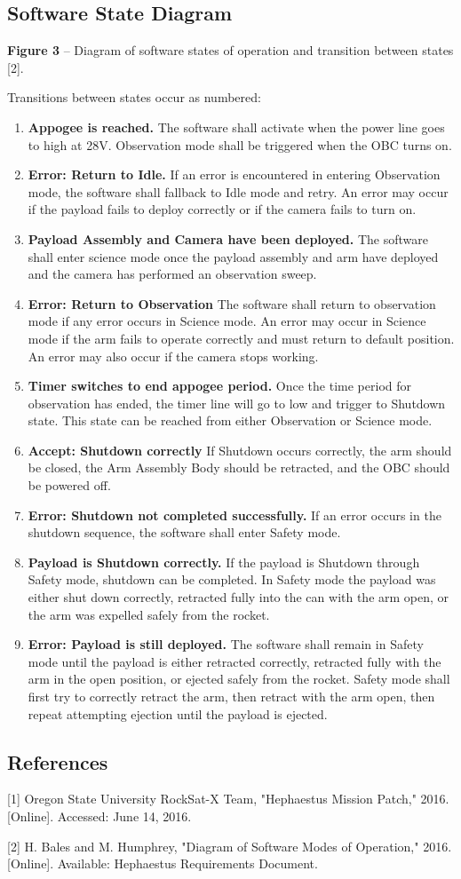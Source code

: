 \subsection{Software State Diagram}

\begin{center}
\textbf{Figure 3} -- Diagram of software states of operation and transition between states [2].

Transitions between states occur as numbered:

\begin{enumerate}
\item{\textbf{Appogee is reached.} The software shall activate when the power line goes to high at 28V. Observation mode shall be triggered when the OBC turns on.}
\item{\textbf{Error: Return to Idle.} If an error is encountered in entering Observation mode, the software shall fallback to Idle mode and retry. An error may occur if the payload fails to deploy correctly or if the camera fails to turn on.}
\item{\textbf{Payload Assembly and Camera have been deployed.} The software shall enter science mode once the payload assembly and arm have deployed and the camera has performed an observation sweep.}
\item{\textbf{Error: Return to Observation} The software shall return to observation mode if any error occurs in Science mode. An error may occur in Science mode if the arm fails to operate correctly and must return to default position. An error may also occur if the camera stops working.}
\item{\textbf{Timer switches to end appogee period.} Once the time period for observation has ended, the timer line will go to low and trigger to Shutdown state. This state can be reached from either Observation or Science mode.}
\item{\textbf{Accept: Shutdown correctly} If Shutdown occurs correctly, the arm should be closed, the Arm Assembly Body should be retracted, and the OBC should be powered off.}
\item{\textbf{Error: Shutdown not completed successfully.} If an error occurs in the shutdown sequence, the software shall enter Safety mode.}
\item{\textbf{Payload is Shutdown correctly.} If the payload is Shutdown through Safety mode, shutdown can be completed. In Safety mode the payload was either shut down correctly, retracted fully into the can with the arm open, or the arm was expelled safely from the rocket.}
\item{\textbf{Error: Payload is still deployed.} The software shall remain in Safety mode until the payload is either retracted correctly, retracted fully with the arm in the open position, or ejected safely from the rocket. Safety mode shall first try to correctly retract the arm, then retract with the arm open, then repeat attempting ejection until the payload is ejected.}
\end{enumerate}
\end{center}

\subsection{References}
[1] Oregon State University RockSat-X Team, "Hephaestus Mission Patch," 2016. [Online]. Accessed: June 14, 2016.

[2] H. Bales and M. Humphrey, "Diagram of Software Modes of Operation," 2016. [Online]. Available: Hephaestus Requirements Document.


